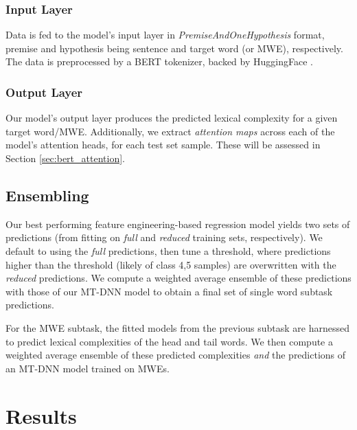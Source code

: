 \documentclass[11pt,a4paper]{article}
\begin{document}
\subsubsection{Input Layer}

Data is fed to the model's input layer in \textit{PremiseAndOneHypothesis} format, premise and hypothesis being sentence and target word (or MWE), respectively. The data is preprocessed by a BERT tokenizer, backed by HuggingFace \citep{wolf_etal_2020_transformers}.

\subsubsection{Output Layer}

Our model's output layer produces the predicted lexical complexity for a given target word/MWE. Additionally, we extract \textit{attention maps} across each of the model's attention heads, for each test set sample. These will be assessed in Section \ref{sec:bert_attention}.

\subsection{Ensembling}

\label{sec:ensembling}

Our best performing feature engineering-based regression model yields two sets of predictions (from fitting on \textit{full} and \textit{reduced} training sets, respectively). We default to using the \textit{full} predictions, then tune a threshold, where predictions higher than the threshold (likely of class 4,5 samples) are overwritten with the \textit{reduced} predictions. We compute a weighted average ensemble of these predictions with those of our MT-DNN model to obtain a final set of single word subtask predictions. 

For the MWE subtask, the fitted models from the previous subtask are harnessed to predict lexical complexities of the head and tail words. We then compute a weighted average ensemble of these predicted complexities \textit{and} the predictions of an MT-DNN model trained on MWEs.

\section{Results}
\end{document}
